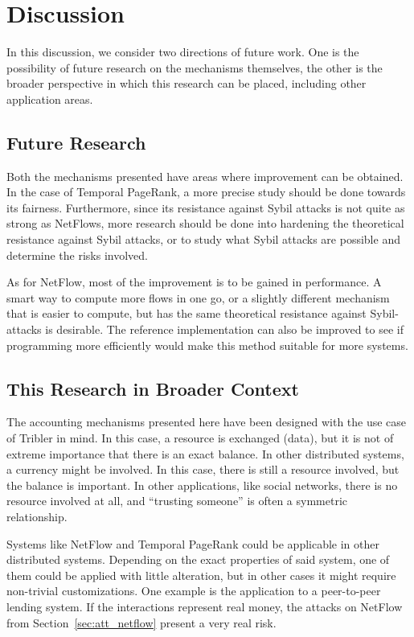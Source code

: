 \documentclass[a4paper,11pt]{book}
\theoremstyle{definition}
\begin{document}
\section{Discussion}

In this discussion, we consider two directions of future work.
One is the possibility of future research on the mechanisms themselves, the other is the broader perspective
in which this research can be placed, including other application areas. 

\subsection{Future Research}

Both the mechanisms presented have areas where improvement can be obtained. In the case of
Temporal PageRank, a more precise study should be done towards its fairness. Furthermore,
since its resistance against Sybil attacks is not quite as strong as NetFlows, more research should be done
into hardening the theoretical resistance against Sybil attacks, or to study what Sybil
attacks are possible and determine the risks involved.

As for NetFlow, most of the improvement is to be gained in performance. A smart way
to compute more flows in one go, or a slightly different mechanism that is
easier to compute, but has the same theoretical resistance against Sybil-attacks 
is desirable. The reference implementation can also be improved to see if
programming more efficiently would make this method suitable for more systems.

\subsection{This Research in Broader Context}
The accounting mechanisms presented here have been designed with the use case of
Tribler in mind. In this case, a resource is exchanged (data), but it is not of extreme
importance that there is an exact balance. In other distributed systems, a currency
might be involved. In this case, there is still a resource involved, but the balance
is important. In other applications, like social networks, there is no resource involved
at all, and ``trusting someone'' is often a symmetric relationship. 

Systems like NetFlow and Temporal PageRank could be applicable in other distributed
systems. Depending on the exact properties of said system, one of them could be
applied with little alteration, but in other cases it might require non-trivial
customizations. One example is the application to a peer-to-peer lending system.
If the interactions represent real money, the attacks on NetFlow from Section~\ref{sec:att_netflow}
present a very real risk.











\appendix



{}

\end{document}
